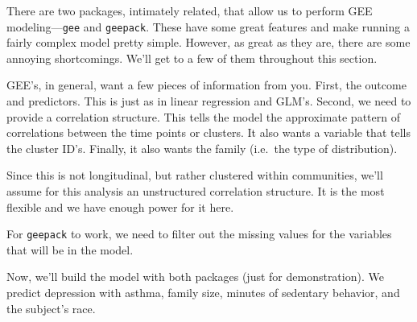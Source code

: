 \documentclass[]{tufte-book}
\newenvironment{Shaded}{}{}
\newcommand{\KeywordTok}[1]{\textcolor[rgb]{0.00,0.44,0.13}{\textbf{#1}}}
\newcommand{\DataTypeTok}[1]{\textcolor[rgb]{0.56,0.13,0.00}{#1}}
\newcommand{\StringTok}[1]{\textcolor[rgb]{0.25,0.44,0.63}{#1}}
\newcommand{\OperatorTok}[1]{\textcolor[rgb]{0.40,0.40,0.40}{#1}}
\newcommand{\NormalTok}[1]{#1}
\theoremstyle{definition}
\theoremstyle{definition}
\theoremstyle{remark}
\begin{document}
There are two packages, intimately related, that allow us to perform GEE
modeling---\texttt{gee} and \texttt{geepack}. These have some great
features and make running a fairly complex model pretty simple. However,
as great as they are, there are some annoying shortcomings. We'll get to
a few of them throughout this section.

GEE's, in general, want a few pieces of information from you. First, the
outcome and predictors. This is just as in linear regression and GLM's.
Second, we need to provide a correlation structure. This tells the model
the approximate pattern of correlations between the time points or
clusters. It also wants a variable that tells the cluster ID's. Finally,
it also wants the family (i.e.~the type of distribution).

Since this is not longitudinal, but rather clustered within communities,
we'll assume for this analysis an unstructured correlation structure. It
is the most flexible and we have enough power for it here.

For \texttt{geepack} to work, we need to filter out the missing values
for the variables that will be in the model.

\begin{Shaded}
\end{Shaded}

Now, we'll build the model with both packages (just for demonstration).
We predict depression with asthma, family size, minutes of sedentary
behavior, and the subject's race.

\begin{Shaded}
\end{Shaded}
\end{document}

